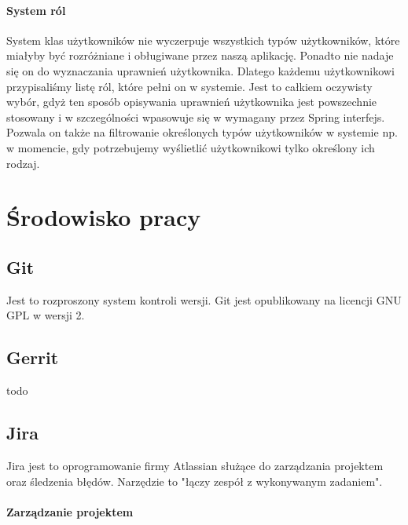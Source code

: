\documentclass[licencjacka]{pracamgr}
\begin{document}
\paragraph{System ról}
System klas użytkowników nie wyczerpuje wszystkich typów użytkowników, które miałyby być rozróżniane i obługiwane przez naszą aplikację. Ponadto nie nadaje się on do wyznaczania uprawnień użytkownika. Dlatego każdemu użytkownikowi przypisaliśmy listę ról, które pełni on w systemie. Jest to całkiem oczywisty wybór, gdyż ten sposób opisywania uprawnień użytkownika jest powszechnie stosowany i w szczególności wpasowuje się w wymagany przez Spring interfejs. Pozwala on także na filtrowanie określonych typów użytkowników w systemie np. w momencie, gdy potrzebujemy wyślietlić użytkownikowi tylko określony ich rodzaj.

\section{Środowisko pracy}
\subsection{Git}
Jest to rozproszony system kontroli wersji. Git jest opublikowany na licencji GNU GPL w wersji 2.
\subsection{Gerrit}
todo
\subsection{Jira}
Jira jest to oprogramowanie firmy Atlassian służące do zarządzania projektem oraz śledzenia błędów. 
Narzędzie to "łączy zespół z wykonywanym zadaniem".


\paragraph{Zarządzanie projektem} 
\end{document}
